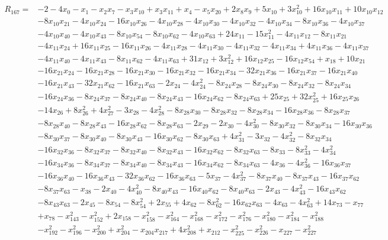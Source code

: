 \begin{align*}
 R_{167}={}&-2 -4x_{0} -x_{1} -x_{2}x_{7} -x_{3}x_{10} +x_{3}x_{11} +x_{4} -x_{5}x_{20} +2x_{8}x_{9} +5x_{10} +3x_{10}^{2} +16x_{10}x_{11} +10x_{10}x_{12}\\
 &-8x_{10}x_{21} -4x_{10}x_{24} -16x_{10}x_{26} -4x_{10}x_{28} -4x_{10}x_{30} -4x_{10}x_{32} -4x_{10}x_{34} -8x_{10}x_{36} -4x_{10}x_{37}\\
 &-4x_{10}x_{40} -4x_{10}x_{43} -8x_{10}x_{54} -8x_{10}x_{62} -4x_{10}x_{63} +24x_{11} -15x_{11}^{2} -4x_{11}x_{12} -8x_{11}x_{21}\\
 &-4x_{11}x_{24} +16x_{11}x_{25} -16x_{11}x_{26} -4x_{11}x_{28} -4x_{11}x_{30} -4x_{11}x_{32} -4x_{11}x_{34} +4x_{11}x_{36} -4x_{11}x_{37}\\
 &-4x_{11}x_{40} -4x_{11}x_{43} -8x_{11}x_{62} -4x_{11}x_{63} +31x_{12} +3x_{12}^{2} +16x_{12}x_{25} -16x_{12}x_{54} +x_{18} +10x_{21}\\
 &-16x_{21}x_{24} -16x_{21}x_{28} -16x_{21}x_{30} -16x_{21}x_{32} -16x_{21}x_{34} -32x_{21}x_{36} -16x_{21}x_{37} -16x_{21}x_{40}\\
 &-16x_{21}x_{43} -32x_{21}x_{62} -16x_{21}x_{63} -2x_{24} -4x_{24}^{2} -8x_{24}x_{28} -8x_{24}x_{30} -8x_{24}x_{32} -8x_{24}x_{34}\\
 &-16x_{24}x_{36} -8x_{24}x_{37} -8x_{24}x_{40} -8x_{24}x_{43} -16x_{24}x_{62} -8x_{24}x_{63} +25x_{25} +32x_{25}^{2} +16x_{25}x_{26}\\
 &-14x_{26} +8x_{26}^{2} +4x_{27}^{2} -3x_{28} -4x_{28}^{2} -8x_{28}x_{30} -8x_{28}x_{32} -8x_{28}x_{34} -16x_{28}x_{36} -8x_{28}x_{37}\\
 &-8x_{28}x_{40} -8x_{28}x_{43} -16x_{28}x_{62} -8x_{28}x_{63} -2x_{29} -2x_{30} -4x_{30}^{2} -8x_{30}x_{32} -8x_{30}x_{34} -16x_{30}x_{36}\\
 &-8x_{30}x_{37} -8x_{30}x_{40} -8x_{30}x_{43} -16x_{30}x_{62} -8x_{30}x_{63} +4x_{31}^{2} -3x_{32} -4x_{32}^{2} -8x_{32}x_{34}\\
 &-16x_{32}x_{36} -8x_{32}x_{37} -8x_{32}x_{40} -8x_{32}x_{43} -16x_{32}x_{62} -8x_{32}x_{63} -8x_{33} -8x_{33}^{2} -4x_{34}^{2}\\
 &-16x_{34}x_{36} -8x_{34}x_{37} -8x_{34}x_{40} -8x_{34}x_{43} -16x_{34}x_{62} -8x_{34}x_{63} -4x_{36} -4x_{36}^{2} -16x_{36}x_{37}\\
 &-16x_{36}x_{40} -16x_{36}x_{43} -32x_{36}x_{62} -16x_{36}x_{63} -5x_{37} -4x_{37}^{2} -8x_{37}x_{40} -8x_{37}x_{43} -16x_{37}x_{62}\\
 &-8x_{37}x_{63} -x_{38} -2x_{40} -4x_{40}^{2} -8x_{40}x_{43} -16x_{40}x_{62} -8x_{40}x_{63} -2x_{43} -4x_{43}^{2} -16x_{43}x_{62}\\
 &-8x_{43}x_{63} -2x_{45} -8x_{54} -8x_{54}^{2} +2x_{55} +4x_{62} -8x_{62}^{2} -16x_{62}x_{63} -4x_{63} -4x_{63}^{2} +14x_{73} -x_{77}\\
 &+x_{78} -x_{143}^{2} -x_{152}^{2} +2x_{158} -x_{158}^{2} -x_{164}^{2} -x_{168}^{2} -x_{172}^{2} -x_{176}^{2} -x_{180}^{2} -x_{184}^{2} -x_{188}^{2}\\
 &-x_{192}^{2} -x_{196}^{2} -x_{200}^{2} +x_{204}^{2} -x_{204}x_{217} +4x_{208}^{2} +x_{212} -x_{225}^{2} -x_{226}^{2} -x_{227} -x_{227}^{2}
\end{align*}
